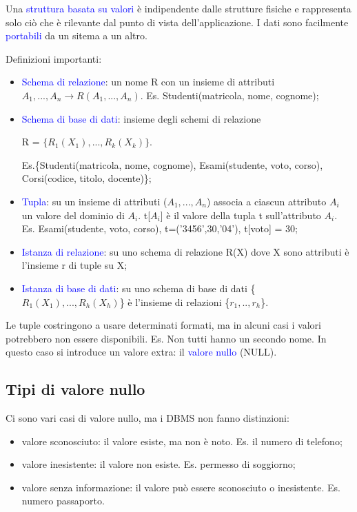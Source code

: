 Una \textcolor{blue}{struttura basata su valori} è indipendente dalle strutture fisiche e rappresenta solo ciò che è rilevante dal punto di vista dell'applicazione. I dati sono facilmente \textcolor{blue}{portabili} da un sitema a un altro.

Definizioni importanti: 
\begin{itemize}
    \item \textcolor{blue}{Schema di relazione}: un nome R con un insieme di attributi $A_1,...,A_n \rightarrow R(A_1,...,A_n)$. Es. Studenti(matricola, nome, cognome);
    \item \textcolor{blue}{Schema di base di dati}: insieme degli schemi di relazione 
    
    R = $\{R_1(X_1),...,R_k(X_k)\}$. 
    
    Es.\{Studenti(matricola, nome, cognome), Esami(studente, voto, corso), Corsi(codice, titolo, docente)\};
    \item \textcolor{blue}{Tupla}: su un insieme di attributi ($A_1,...,A_n$) associa a ciascun attributo $A_i$ un valore del dominio di $A_i$. t[$A_i$] è il valore della tupla t sull'attributo $A_i$. Es. Esami(studente, voto, corso), t=('3456',30,'04'), t[voto] = 30;
    \item \textcolor{blue}{Istanza di relazione}: su uno schema di relazione R(X) dove X sono attributi è l'insieme r di tuple su X;
    \item \textcolor{blue}{Istanza di base di dati}: su uno schema di base di dati \{$R_1(X_1), ..., R_h(X_h)$\} è l'insieme di relazioni \{$r_1,..,r_h$\}.
\end{itemize}

Le tuple costringono a usare determinati formati, ma in alcuni casi i valori potrebbero non essere disponibili. Es. Non tutti hanno un secondo nome. In questo caso si introduce un valore extra: il \textcolor{blue}{valore nullo} (NULL).

\subsection{Tipi di valore nullo}

\label{Valori nulli}

Ci sono vari casi di valore nullo, ma i DBMS non fanno distinzioni:
\begin{itemize}
    \item valore sconosciuto: il valore esiste, ma non è noto. Es. il numero di telefono;
    \item valore inesistente: il valore non esiste. Es. permesso di soggiorno;
    \item valore senza informazione: il valore può essere sconosciuto o inesistente. Es. numero passaporto.
\end{itemize}

